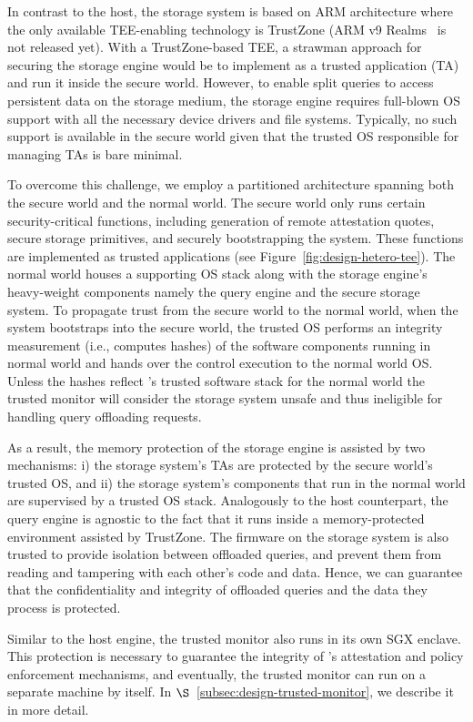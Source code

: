 In contrast to the host, the storage system is based on ARM architecture where the only available TEE-enabling technology is TrustZone (ARM v9 Realms~\cite{arm-cca} is not released yet). With a TrustZone-based TEE, a strawman approach for securing the storage engine would be to implement as a trusted application (TA) and run it inside the secure world. However, to enable split queries to access persistent data on the storage medium, the storage engine requires full-blown OS support with all the necessary device drivers and file systems. Typically, no such support is available in the secure world given that the trusted OS responsible for managing TAs is bare minimal.

To overcome this challenge, we employ a partitioned architecture spanning both the secure world and the normal world. The secure world only runs certain security-critical functions, including generation of remote attestation quotes, secure storage primitives, and securely bootstrapping the system. These functions are implemented as trusted applications (see Figure~\ref{fig:design-hetero-tee}). The normal world houses a supporting OS stack along with the storage engine's heavy-weight components namely the query engine and the secure storage system. To propagate trust from the secure world to the normal world, when the system bootstraps into the secure world, the trusted OS performs an integrity measurement (i.e., computes hashes) of the software components running in normal world and hands over the control execution to the normal world OS. Unless the hashes reflect \project's trusted software stack for the normal world the trusted monitor will consider the storage system unsafe and thus ineligible for handling query offloading requests.

As a result, the memory protection of the storage engine is assisted by two mechanisms: i) the storage system's TAs are protected by the secure world's trusted OS, and ii) the storage system's components that run in the normal world are supervised by a trusted OS stack. Analogously to the host counterpart, the query engine is agnostic to the fact that it runs inside a memory-protected environment assisted by TrustZone. The firmware on the storage system is also trusted to provide isolation between offloaded queries, and prevent them from reading and tampering with each other's code and data. Hence, we can guarantee that the confidentiality and integrity of offloaded queries and the data they process is protected.

 Similar to the host engine, the trusted monitor also runs in its own SGX enclave. This protection is necessary to guarantee the integrity of \project's attestation and policy enforcement mechanisms, and eventually, the trusted monitor can run on a separate machine by itself. In $\S$~\ref{subsec:design-trusted-monitor}, we describe it in more detail.


